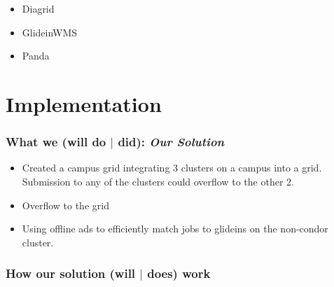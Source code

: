 \documentclass[11pt]{article}
\begin{document}
\begin{itemize}

\item
Diagrid

\item 
GlideinWMS

\item
Panda


\end{itemize}

\section{Implementation}
\label{sec:Implementation}

\subsubsection*{What we (will do $|$ did): {\em Our Solution}}
\begin{itemize}



\item
Created a campus grid integrating 3 clusters on a campus into a grid.  Submission to any of the clusters could overflow to the other 2.

\item
Overflow to the grid

\item
Using offline ads to efficiently match jobs to glideins on the non-condor cluster.

\end{itemize}



\subsubsection*{How our solution (will $|$ does) work}
\end{document}

